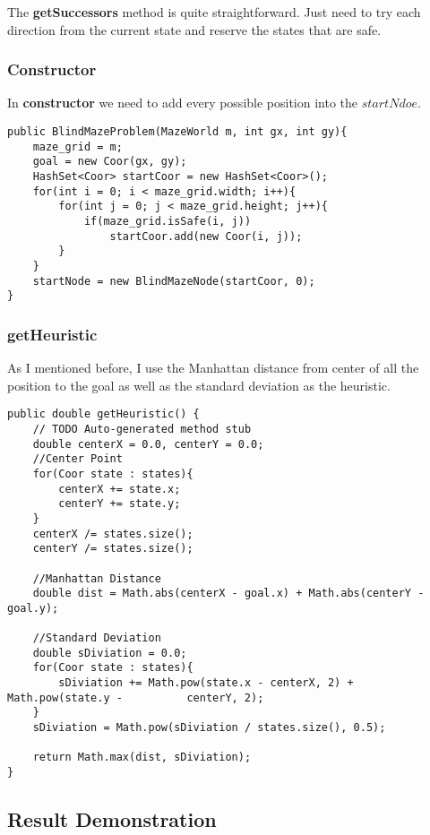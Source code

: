 \documentclass{article}
\begin{document}
The \textbf{getSuccessors} method is quite straightforward. Just need to try each direction from the current state and reserve the states that are safe.

\subsubsection{Constructor}

In \textbf{constructor} we need to add every possible position into the $startNdoe$.

\begin{lstlisting}
public BlindMazeProblem(MazeWorld m, int gx, int gy){
	maze_grid = m;
	goal = new Coor(gx, gy);
	HashSet<Coor> startCoor = new HashSet<Coor>();
	for(int i = 0; i < maze_grid.width; i++){
		for(int j = 0; j < maze_grid.height; j++){
			if(maze_grid.isSafe(i, j))
				startCoor.add(new Coor(i, j));
		}
	}
	startNode = new BlindMazeNode(startCoor, 0);
}
\end{lstlisting}



\subsubsection{getHeuristic}

As I mentioned before, I use the Manhattan distance from center of all the position to the goal as well as the standard deviation as the heuristic.

\begin{lstlisting}
public double getHeuristic() {
	// TODO Auto-generated method stub
	double centerX = 0.0, centerY = 0.0;
	//Center Point
	for(Coor state : states){
		centerX += state.x;
		centerY += state.y;
	}
	centerX /= states.size();
	centerY /= states.size();
			
	//Manhattan Distance
	double dist = Math.abs(centerX - goal.x) + Math.abs(centerY - goal.y);
			
	//Standard Deviation
	double sDiviation = 0.0;
	for(Coor state : states){
		sDiviation += Math.pow(state.x - centerX, 2) + Math.pow(state.y -          centerY, 2);
	}
	sDiviation = Math.pow(sDiviation / states.size(), 0.5);
			
	return Math.max(dist, sDiviation);
}

\end{lstlisting}

\clearpage
\subsection{Result Demonstration}
\end{document}
